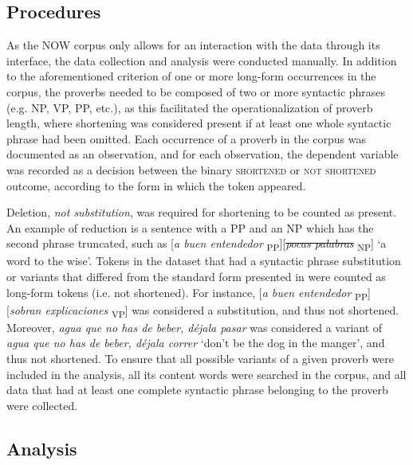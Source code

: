 \documentclass[output=paper,colorlinks,citecolor=brown,draftmode]{langscibook}
\begin{document}
\subsection{Procedures}

As the NOW corpus only allows for an interaction with the data through its interface, the data collection and analysis were conducted manually. In addition to the aforementioned criterion of one or more long-form occurrences in the corpus, the proverbs needed to be composed of two or more syntactic phrases (e.g. NP, VP, PP, etc.), as this facilitated the operationalization of proverb length, where shortening was considered present if at least one whole syntactic phrase had been omitted. Each occurrence of a proverb in the corpus was documented as an observation, and for each observation, the dependent variable was recorded as a decision between the binary \textsc{shortened} or \textsc{not shortened} outcome, according to the form in which the token appeared.

Deletion, \emph{not substitution}, was required for shortening to be counted as present. An example of reduction is a sentence with a PP and an NP which has the second phrase truncated, such as [\emph{a buen entendedor} \textsubscript{PP}][\st{\emph{pocas palabras}} \textsubscript{NP}]  `a word to the wise'. Tokens in the dataset that had a syntactic phrase substitution or variants that differed from the standard form presented in \citet{pedicone2004refranero} were counted as long-form tokens (i.e. not shortened). For instance, [\emph{a buen entendedor} \textsubscript{PP}] [\emph{sobran explicaciones} \textsubscript{VP}] was considered a substitution, and thus not shortened. Moreover, \emph{agua que no has de beber, d{é}jala pasar} was considered a variant of \emph{agua que no has de beber, d{é}jala correr} `don't be the dog in the manger', and thus not shortened. To ensure that all possible variants of a given proverb were included in the analysis, all its content words were searched in the corpus, and all data that had at least one complete syntactic phrase belonging to the proverb were collected.

\subsection{Analysis}
\end{document}
